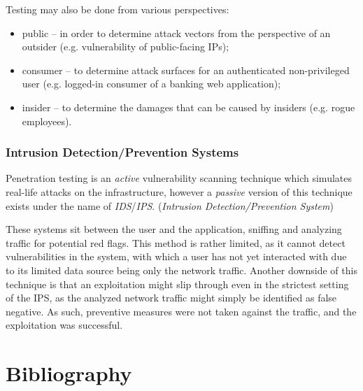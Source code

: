 \documentclass[a4paper,12pt]{article}
\begin{document}
	\noindent Testing may also be done from various perspectives:
	
	\begin{itemize}
		\item public -- in order to determine attack vectors from the perspective of an outsider (e.g. vulnerability of public-facing IPs);
		\item consumer -- to determine attack surfaces for an authenticated non-privileged user (e.g. logged-in consumer of a banking web application);
		\item insider -- to determine the damages that can be caused by insiders (e.g. rogue employees).
	\end{itemize}
	
\subsubsection{Intrusion Detection/Prevention Systems}
	
	Penetration testing is an \textit{active} vulnerability scanning technique which simulates real-life attacks on the infrastructure, however a \textit{passive} version of this technique exists under the name of \textit{IDS}/\textit{IPS}. (\textit{Intrusion Detection/Prevention System})
	
	These systems sit between the user and the application, sniffing and analyzing traffic for potential red flags. This method is rather limited, as it cannot detect vulnerabilities in the system, with which a user has not yet interacted with due to its limited data source being only the network traffic. Another downside of this technique is that an exploitation might slip through even in the strictest setting of the IPS, as the analyzed network traffic might simply be identified as false negative. As such, preventive measures were not taken against the traffic, and the exploitation was successful.
	
\newpage
\section{Bibliography}

	\begingroup
	\renewcommand{\section}[2]{}
		
		
	\endgroup
\end{document}

